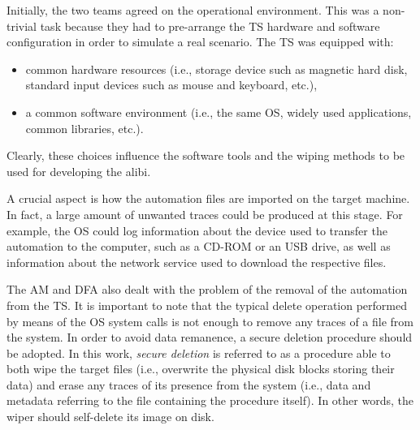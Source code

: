 \documentclass[10pt, conference]{IEEEtran}
\begin{document}


Initially, the two teams agreed on the operational environment. 
This was a non-trivial task because they had to pre-arrange the TS hardware and software configuration in order to simulate a real
scenario. The TS was equipped with: 
\begin{itemize}
 \item common hardware resources (i.e., storage device such as magnetic hard disk, standard input devices such as mouse and keyboard, etc.),
 \item a common software environment (i.e., the same OS, widely used applications, common libraries, etc.).
\end{itemize}

Clearly, these choices influence the software tools and the wiping methods to be used for developing the alibi.

A crucial aspect is how the automation files are imported on the target machine. In fact, a large amount of unwanted traces could
be produced at this stage. For example, the OS could log information about the device used to transfer the automation to the computer,
such as a CD-ROM or an USB drive, as well as information about the network service used to download the respective files. 

The AM and DFA also dealt with the problem of the removal of the automation from the TS. It is important to note that the typical
delete operation performed by means of the OS system calls is not enough to remove any traces of a file from the system. In order
to avoid data remanence, a secure deletion procedure should be adopted. In this work, \textit{secure deletion} is referred to as a
procedure able to both wipe the target files (i.e., overwrite the physical disk blocks storing their data) and erase any traces of its
presence from the system (i.e., data and metadata referring to the file containing the procedure itself). In other words, the wiper
should self-delete its image on disk. 
\end{document}
